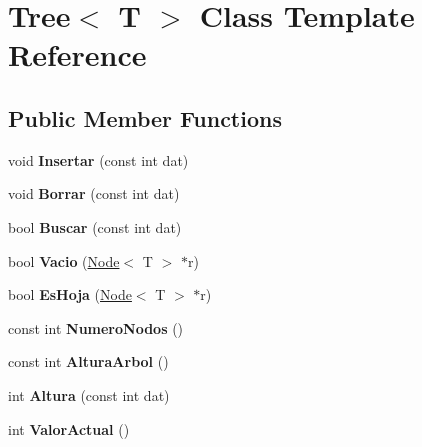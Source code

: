 \hypertarget{classTree}{}\section{Tree$<$ T $>$ Class Template Reference}
\label{classTree}
\subsection*{Public Member Functions}
\begin{DoxyCompactItemize}
\item 
\mbox{\label{classTree_ac49dc6e29335c4859bd50a9bd8464d50}} 
void {\bfseries Insertar} (const int dat)
\item 
\mbox{\label{classTree_acb994c9ad0367d4f9e283de0ec7801ab}} 
void {\bfseries Borrar} (const int dat)
\item 
\mbox{\label{classTree_a95703817b34b409b330887b3b6dd1821}} 
bool {\bfseries Buscar} (const int dat)
\item 
\mbox{\label{classTree_a32e1ee52d60d3aa86b45bfe099bff437}} 
bool {\bfseries Vacio} (\hyperlink{classNode}{Node}$<$ T $>$ $\ast$r)
\item 
\mbox{\label{classTree_aa08897cbb085f2e702abb9dab98983e8}} 
bool {\bfseries Es\+Hoja} (\hyperlink{classNode}{Node}$<$ T $>$ $\ast$r)
\item 
\mbox{\label{classTree_a09d2e96a6f198b466bb1f1b617514289}} 
const int {\bfseries Numero\+Nodos} ()
\item 
\mbox{\label{classTree_aaeed2cc08222b971a5fa6eba71f0a4cf}} 
const int {\bfseries Altura\+Arbol} ()
\item 
\mbox{\label{classTree_a41a4e44f7664d33bdb1fd5b8895dec4d}} 
int {\bfseries Altura} (const int dat)
\item 
\mbox{\label{classTree_a5341226c5c4bb568f97876733c4d8f3e}} 
int {\bfseries Valor\+Actual} ()
\item 
\mbox{\label{classTree_a4076a3a1b5987d06c300553a448250f1}} 

\end{DoxyCompactItemize}
